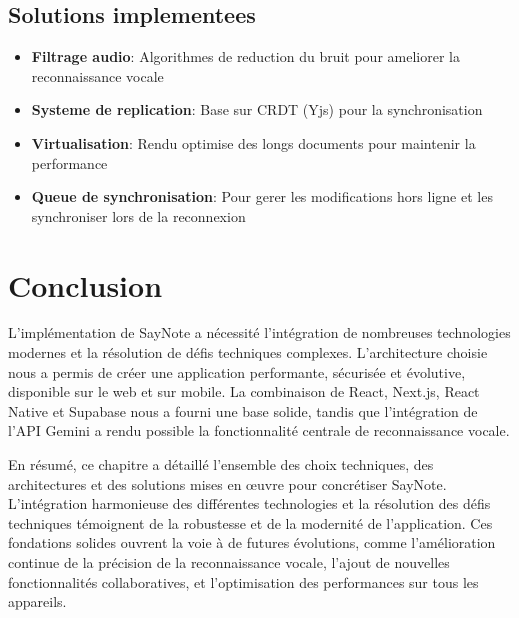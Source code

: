 \subsection{Solutions implementees}
\begin{itemize}
    \item \textbf{Filtrage audio}: Algorithmes de reduction du bruit pour ameliorer la reconnaissance vocale
    \item \textbf{Systeme de replication}: Base sur CRDT (Yjs) pour la synchronisation
    \item \textbf{Virtualisation}: Rendu optimise des longs documents pour maintenir la performance
    \item \textbf{Queue de synchronisation}: Pour gerer les modifications hors ligne et les synchroniser lors de la reconnexion
\end{itemize}



\section*{Conclusion}
L'implémentation de SayNote a nécessité l'intégration de nombreuses technologies modernes et la résolution de défis techniques complexes. L'architecture choisie nous a permis de créer une application performante, sécurisée et évolutive, disponible sur le web et sur mobile. La combinaison de React, Next.js, React Native et Supabase nous a fourni une base solide, tandis que l'intégration de l'API Gemini a rendu possible la fonctionnalité centrale de reconnaissance vocale.

En résumé, ce chapitre a détaillé l'ensemble des choix techniques, des architectures et des solutions mises en œuvre pour concrétiser SayNote. L'intégration harmonieuse des différentes technologies et la résolution des défis techniques témoignent de la robustesse et de la modernité de l'application. Ces fondations solides ouvrent la voie à de futures évolutions, comme l'amélioration continue de la précision de la reconnaissance vocale, l'ajout de nouvelles fonctionnalités collaboratives, et l'optimisation des performances sur tous les appareils.